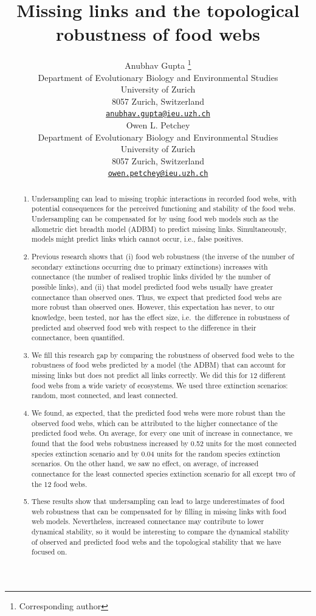 \documentclass{article}
\title{Missing links and the topological robustness of food webs}
\author{
    Anubhav Gupta
    \thanks{Corresponding author}
   \\
    Department of Evolutionary Biology and Environmental Studies \\
    University of Zurich \\
  8057 Zurich, Switzerland \\
  \texttt{\href{mailto:anubhav.gupta@ieu.uzh.ch}{\nolinkurl{anubhav.gupta@ieu.uzh.ch}}} \\
   \And
    Owen L. Petchey
   \\
    Department of Evolutionary Biology and Environmental Studies \\
    University of Zurich \\
  8057 Zurich, Switzerland \\
  \texttt{\href{mailto:owen.petchey@ieu.uzh.ch}{\nolinkurl{owen.petchey@ieu.uzh.ch}}} \\
  }
\providecommand{\tightlist}{%
  \setlength{\itemsep}{0pt}\setlength{\parskip}{0pt}}
\begin{document}
\maketitle


\begin{abstract}
\begin{enumerate}
\def\labelenumi{\arabic{enumi})}
\tightlist
\item
  Undersampling can lead to missing trophic interactions in recorded
  food webs, with potential consequences for the perceived functioning
  and stability of the food webs. Undersampling can be compensated for
  by using food web models such as the allometric diet breadth model
  (ADBM) to predict missing links. Simultaneously, models might predict
  links which cannot occur, i.e., false positives.
\item
  Previous research shows that (i) food web robustness (the inverse of
  the number of secondary extinctions occurring due to primary
  extinctions) increases with connectance (the number of realised
  trophic links divided by the number of possible links), and (ii) that
  model predicted food webs usually have greater connectance than
  observed ones. Thus, we expect that predicted food webs are more
  robust than observed ones. However, this expectation has never, to our
  knowledge, been tested, nor has the effect size, i.e.~the difference
  in robustness of predicted and observed food web with respect to the
  difference in their connectance, been quantified.
\item
  We fill this research gap by comparing the robustness of observed food
  webs to the robustness of food webs predicted by a model (the ADBM)
  that can account for missing links but does not predict all links
  correctly. We did this for 12 different food webs from a wide variety
  of ecosystems. We used three extinction scenarios: random, most
  connected, and least connected.
\item
  We found, as expected, that the predicted food webs were more robust
  than the observed food webs, which can be attributed to the higher
  connectance of the predicted food webs. On average, for every one unit
  of increase in connectance, we found that the food webs robustness
  increased by 0.52 units for the most connected species extinction
  scenario and by 0.04 units for the random species extinction
  scenarios. On the other hand, we saw no effect, on average, of
  increased connectance for the least connected species extinction
  scenario for all except two of the 12 food webs.
\item
  These results show that undersampling can lead to large underestimates
  of food web robustness that can be compensated for by filling in
  missing links with food web models. Nevertheless, increased
  connectance may contribute to lower dynamical stability, so it would
  be interesting to compare the dynamical stability of observed and
  predicted food webs and the topological stability that we have focused
  on.
\end{enumerate}
\end{abstract}
\end{document}
